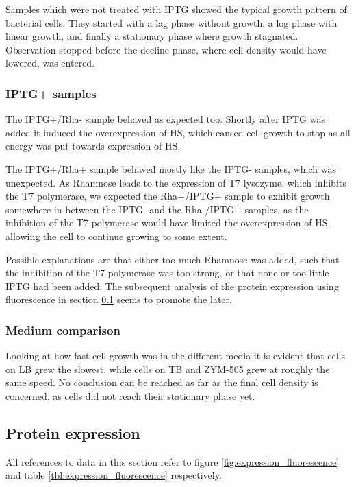 \documentclass[a4paper]{scrreprt}
\begin{document}
Samples which were not treated with IPTG showed the typical growth pattern of
bacterial cells. They started with a lag phase without growth, a log phase with
linear growth, and finally a stationary phase where growth stagnated.
Observation stopped before the decline phase, where cell density would have
lowered, was entered.

\subsubsection{IPTG+ samples}

The IPTG+/Rha- sample behaved as expected too. Shortly after IPTG was added it
induced the overexpression of HS, which caused cell growth to stop as all
energy was put towards expression of HS.

The IPTG+/Rha+ sample behaved mostly like the IPTG- samples, which was
unexpected. As Rhamnose leads to the expression of T7 lysozyme, which inhibits
the T7 polymerase\cite{memstar}, we expected the Rha+/IPTG+ sample to exhibit
growth somewhere in between the IPTG- and the Rha-/IPTG+ samples, as the
inhibition of the T7 polymerase would have limited the overexpression of HS,
allowing the cell to continue growing to some extent.

Possible explanations are that either too much Rhamnose was added, such that
the inhibition of the T7 polymerase was too strong, or that none or too little
IPTG had been added. The subsequent analysis of the protein expression using
fluorescence in section \ref{sec:fluorescence} seems to promote the later.

\subsubsection{Medium comparison}

Looking at how fast cell growth was in the different media it is evident that
cells on LB grew the slowest, while cells on TB and ZYM-505 grew at roughly the
same speed. No conclusion can be reached as far as the final cell density is
concerned, as cells did not reach their stationary phase yet.

\subsection{Protein expression}
\label{sec:fluorescence}

All references to data in this section refer to figure
\ref{fig:expression_fluorescence} and table \ref{tbl:expression_fluorescence}
respectively.
\end{document}
